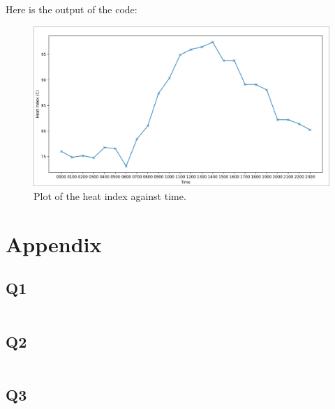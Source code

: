 \documentclass[11pt]{article}
\begin{document}
Here is the output of the code:

\begin{center}
\begin{figure}[H]
  \centering
  \includegraphics[scale=0.25]{Images/Q3.png}
  \caption{Plot of the heat index against time.}
\end{figure}
\end{center}


\section{Appendix}

\subsection{Q1}

\inputminted[bgcolor=lightgray, breaklines, linenos]{python}{./Code/Q1.py}

\subsection{Q2}

\inputminted[bgcolor=lightgray, breaklines, linenos]{python}{./Code/Q2.py}

\subsection{Q3}

\inputminted[bgcolor=lightgray, breaklines, linenos]{python}{./Code/Q3.py}

\newpage
\printbibliography
\end{document}
